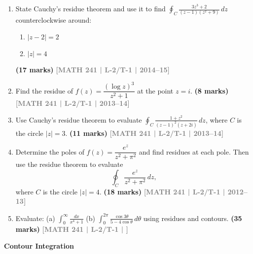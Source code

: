\documentclass[12pt,a4paper]{article}
\newcommand{\yr}[1]{\hfill\textcolor{gray}{\small\textbf{[#1]}}}
\newcommand{\mk}[1]{\textcolor{orange!70!black}{\small\textbf{(#1 marks)}}}
\newcommand{\subtopic}[2]{%
  \vspace{10pt}
  \noindent\begin{tcolorbox}[colback=#1!8,colframe=#1,boxrule=0.6pt,arc=4pt,
    left=6pt,right=6pt,top=4pt,bottom=4pt]
    \small\bfseries\textcolor{#1}{#2}
  \end{tcolorbox}
  \vspace{2pt}
}
\begin{document}
\begin{enumerate}
\begin{itemize}
    \item[(a)] $\displaystyle \int_{-\infty}^{+\infty} \frac{x^2}{(x^2 + 1)^2 (x^2 + 2x + 2)} \, dx$
\mk{17}  
    
    \item[(b)] $\displaystyle \int_{0}^{\infty} \frac{x^3 \sin x}{(x^2 + 1)(x^2 + 9)} \, dx$
    \mk{18}
\end{itemize} 
\yr{MATH 241 | L-2/T-1 | 2015--16}

\item State Cauchy's residue theorem and use it to find $\displaystyle\oint_{C}\frac{3z^{3}+2}{(z-1)(z^{2}+9)}\,dz$ counterclockwise around:
\begin{enumerate}
  \item $|z-2|=2$
  \item $|z|=4$
\end{enumerate}
\mk{17} \yr{MATH 241 | L-2/T-1 | 2014--15}

\item Find the residue of $f(z)=\dfrac{(\log z)^{3}}{z^{2}+1}$ at the point $z=i$.
\mk{8} \yr{MATH 241 | L-2/T-1 | 2013--14}

\item Use Cauchy's residue theorem to evaluate $\displaystyle\oint_{C}\frac{1+z^{2}}{(z-1)^{2}(z+2i)}\,dz$, where $C$ is the circle $|z|=3$.
\mk{11} \yr{MATH 241 | L-2/T-1 | 2013--14}

\item Determine the poles of $f(z)=\dfrac{e^{z}}{z^{2}+\pi^{2}}$ and find residues at each pole. Then use the residue theorem to evaluate
\[
\oint_{C} \frac{e^{z}}{z^{2}+\pi^{2}}\,dz,
\]
where $C$ is the circle $|z|=4$.
\mk{18} \yr{MATH 241 | L-2/T-1 | 2012--13}

\item Evaluate: (a) $\displaystyle\int_{0}^{\infty}\frac{dx}{x^{4}+1}$ \quad (b) $\displaystyle\int_{0}^{2\pi}\frac{\cos 3\theta}{5-4\cos\theta}\,d\theta$ using residues and contours.
\mk{35} \yr{MATH 241 | L-2/T-1 | }

\end{enumerate}

\subtopic{cE}{Contour Integration}
\label{sub:s5-contour}
\end{document}
